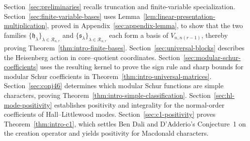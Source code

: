 \documentclass[12pt,reqno,a4paper]{amsart}
\numberwithin{equation}{section}
\numberwithin{figure}{section}
\theoremstyle{plain}
\theoremstyle{definition}
\begin{document}
Section~\ref{sec:preliminaries} recalls truncation and finite-variable
specialization.  Section~\ref{sec:finite-variable-bases} uses
Lemma~\ref{lem:linear-presentation-multiplication}, proved in
Appendix~\ref{sec:appendix-lemma}, to show that the two families
$\{\mathfrak h_\lambda\}_{\lambda\in\mathcal R_{n,r}}$ and
$\{\mathfrak s_\lambda\}_{\lambda\in\mathcal R_{n,r}}$ each form a basis
of $V_{n,n(r-1)}$, thereby proving Theorem~\ref{thm:intro-finite-bases}.
Section~\ref{sec:universal-blocks} describes the Heisenberg action in
core--quotient coordinates.  Section~\ref{sec:modular-schur-coefficients}
uses the resulting kernel to prove the sign rule and sharp bounds for
modular Schur coefficients in Theorem~\ref{thm:intro-universal-matrices}.
Section~\ref{sec:conj46} determines which modular Schur functions are
simple characters, proving Theorem~\ref{thm:intro-simple-classification}.
Section~\ref{sec:hl-mode-positivity}
establishes positivity and integrality for the normal-order coefficients
of Hall--Littlewood modes.  Section~\ref{sec:c1-positivity} proves
Theorem~\ref{thm:intro-c1}, which settles Ben Dali and D'Adderio's
Conjecture~1 on the creation operator and yields positivity for
Macdonald characters.
\end{document}
